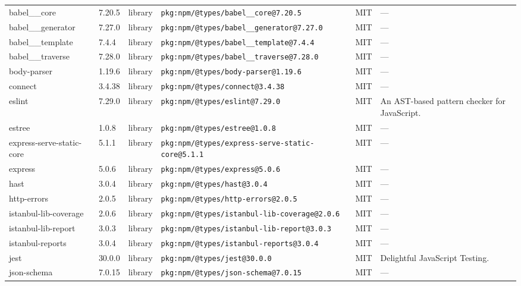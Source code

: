 \documentclass[11pt,a4paper]{article}
\begin{document}
\begin{longtable}{|p{4cm}|p{2cm}|p{1.6cm}|p{5cm}|p{1.5cm}|p{3.5cm}|}
\raggedright babel\_\_core & 7.20.5 & library & \small\texttt{pkg:npm/@types/babel\_\_core@7.20.5} & MIT & \small — \\
\raggedright babel\_\_generator & 7.27.0 & library & \small\texttt{pkg:npm/@types/babel\_\_generator@7.27.0} & MIT & \small — \\
\raggedright babel\_\_template & 7.4.4 & library & \small\texttt{pkg:npm/@types/babel\_\_template@7.4.4} & MIT & \small — \\
\raggedright babel\_\_traverse & 7.28.0 & library & \small\texttt{pkg:npm/@types/babel\_\_traverse@7.28.0} & MIT & \small — \\
\raggedright body-parser & 1.19.6 & library & \small\texttt{pkg:npm/@types/body-parser@1.19.6} & MIT & \small — \\
\raggedright connect & 3.4.38 & library & \small\texttt{pkg:npm/@types/connect@3.4.38} & MIT & \small — \\
\raggedright eslint & 7.29.0 & library & \small\texttt{pkg:npm/@types/eslint@7.29.0} & MIT & \small An AST-based pattern checker for JavaScript. \\
\raggedright estree & 1.0.8 & library & \small\texttt{pkg:npm/@types/estree@1.0.8} & MIT & \small — \\
\raggedright express-serve-static-core & 5.1.1 & library & \small\texttt{pkg:npm/@types/express-serve-static-core@5.1.1} & MIT & \small — \\
\raggedright express & 5.0.6 & library & \small\texttt{pkg:npm/@types/express@5.0.6} & MIT & \small — \\
\raggedright hast & 3.0.4 & library & \small\texttt{pkg:npm/@types/hast@3.0.4} & MIT & \small — \\
\raggedright http-errors & 2.0.5 & library & \small\texttt{pkg:npm/@types/http-errors@2.0.5} & MIT & \small — \\
\raggedright istanbul-lib-coverage & 2.0.6 & library & \small\texttt{pkg:npm/@types/istanbul-lib-coverage@2.0.6} & MIT & \small — \\
\raggedright istanbul-lib-report & 3.0.3 & library & \small\texttt{pkg:npm/@types/istanbul-lib-report@3.0.3} & MIT & \small — \\
\raggedright istanbul-reports & 3.0.4 & library & \small\texttt{pkg:npm/@types/istanbul-reports@3.0.4} & MIT & \small — \\
\raggedright jest & 30.0.0 & library & \small\texttt{pkg:npm/@types/jest@30.0.0} & MIT & \small Delightful JavaScript Testing. \\
\raggedright json-schema & 7.0.15 & library & \small\texttt{pkg:npm/@types/json-schema@7.0.15} & MIT & \small — \\

\end{longtable}
\end{document}
